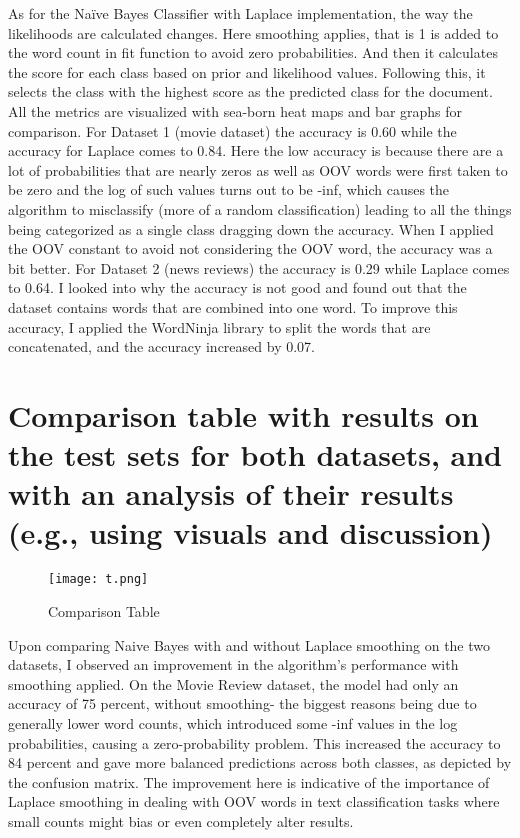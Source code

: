 \documentclass{article}
\begin{document}
As for the Naïve Bayes Classifier with Laplace implementation, the way the likelihoods are calculated changes. Here smoothing applies, that is 1 is added to the word count in fit function to avoid zero probabilities. And then it calculates the score for each class based on prior and likelihood values. Following this, it selects the class with the highest score as the predicted class for the document. All the metrics are visualized with sea-born heat maps and bar graphs for comparison. For Dataset 1 (movie dataset) the accuracy is 0.60 while the accuracy for Laplace comes to 0.84. Here the low accuracy is because there are a lot of probabilities that are nearly zeros as well as OOV words were first taken to be zero and the log of such values turns out to be -inf, which causes the algorithm to misclassify (more of a random classification) leading to all the things being categorized as a single class dragging down the accuracy. When I applied the OOV constant to avoid not considering the OOV word, the accuracy was a bit better. For Dataset 2 (news reviews) the accuracy is 0.29 while Laplace comes to 0.64. I looked into why the accuracy is not good and found out that the dataset contains words that are combined into one word. To improve this accuracy, I applied the WordNinja library to split the words that are concatenated, and the accuracy increased by 0.07.


\section*{Comparison table with results on the test sets for both datasets, and with an analysis of their results (e.g., using visuals and discussion)}

\begin{figure}[H]
    \centering
    \texttt{[image: t.png]}
    \caption{Comparison Table}
    \label{fig:your_label}
\end{figure}

Upon comparing Naive Bayes with and without Laplace smoothing on the two datasets, I observed an improvement in the algorithm's performance with smoothing applied. On the Movie Review dataset, the model had only an accuracy of 75 percent, without smoothing- the biggest reasons being due to generally lower word counts, which introduced some -inf values in the log probabilities, causing a zero-probability problem. This increased the accuracy to 84 percent and gave more balanced predictions across both classes, as depicted by the confusion matrix. The improvement here is indicative of the importance of Laplace smoothing in dealing with OOV words in text classification tasks where small counts might bias or even completely alter results. 
\end{document}
